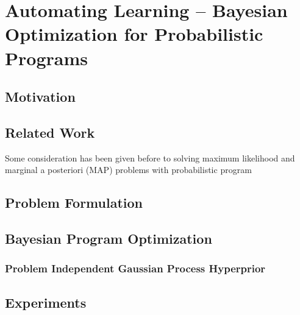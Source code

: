 %

\chapter{Automating Learning -- Bayesian Optimization for Probabilistic Programs}
\label{chp:bopp}



\section{Motivation} 
\label{sec:IntroductionBOPP}



\section{Related Work} 
\label{sec:bopp:related}

Some consideration
has been given before to solving maximum likelihood and marginal a posteriori (MAP) problems
with probabilistic program~\cite{tolpin-socs-2015}

\section{Problem Formulation}
\label{sec:problem}



\section{Bayesian Program Optimization}
\label{sec:bopp}



\subsection{Problem Independent Gaussian Process Hyperprior}
\label{sec:app:hyperprior}



\section{Experiments}

